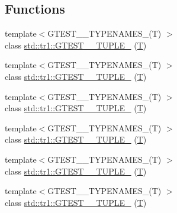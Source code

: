 \subsection*{Functions}
\begin{DoxyCompactItemize}
\item 
{\footnotesize template$<$G\+T\+E\+S\+T\+\_\+\_\+\+T\+Y\+P\+E\+N\+A\+M\+E\+S\+\_\+(\+T) $>$ }\\class \hyperlink{namespacestd_1_1tr1_a9971f52f994f142fe36c786b991cfd3e}{std\+::tr1\+::\+G\+T\+E\+S\+T\+\_\+\_\+\+T\+U\+P\+L\+E\+\_\+} (\hyperlink{functions__7_8js_adf1f3edb9115acb0a1e04209b7a9937b}{T})
\item 
{\footnotesize template$<$G\+T\+E\+S\+T\+\_\+\_\+\+T\+Y\+P\+E\+N\+A\+M\+E\+S\+\_\+(\+T) $>$ }\\class \hyperlink{namespacestd_1_1tr1_a05651180c3a4c06fe0f3b09144b82b93}{std\+::tr1\+::\+G\+T\+E\+S\+T\+\_\+\_\+\+T\+U\+P\+L\+E\+\_\+} (\hyperlink{functions__7_8js_adf1f3edb9115acb0a1e04209b7a9937b}{T})
\item 
{\footnotesize template$<$G\+T\+E\+S\+T\+\_\+\_\+\+T\+Y\+P\+E\+N\+A\+M\+E\+S\+\_\+(\+T) $>$ }\\class \hyperlink{namespacestd_1_1tr1_a368170c49cc7d7f130c0564bbad01205}{std\+::tr1\+::\+G\+T\+E\+S\+T\+\_\+\_\+\+T\+U\+P\+L\+E\+\_\+} (\hyperlink{functions__7_8js_adf1f3edb9115acb0a1e04209b7a9937b}{T})
\item 
{\footnotesize template$<$G\+T\+E\+S\+T\+\_\+\_\+\+T\+Y\+P\+E\+N\+A\+M\+E\+S\+\_\+(\+T) $>$ }\\class \hyperlink{namespacestd_1_1tr1_a661b17d2b7137863f06a016762f5c888}{std\+::tr1\+::\+G\+T\+E\+S\+T\+\_\+\_\+\+T\+U\+P\+L\+E\+\_\+} (\hyperlink{functions__7_8js_adf1f3edb9115acb0a1e04209b7a9937b}{T})
\item 
{\footnotesize template$<$G\+T\+E\+S\+T\+\_\+\_\+\+T\+Y\+P\+E\+N\+A\+M\+E\+S\+\_\+(\+T) $>$ }\\class \hyperlink{namespacestd_1_1tr1_a51b070e2eb5e6bb83a290f35c19667dd}{std\+::tr1\+::\+G\+T\+E\+S\+T\+\_\+\_\+\+T\+U\+P\+L\+E\+\_\+} (\hyperlink{functions__7_8js_adf1f3edb9115acb0a1e04209b7a9937b}{T})
\item 
{\footnotesize template$<$G\+T\+E\+S\+T\+\_\+\_\+\+T\+Y\+P\+E\+N\+A\+M\+E\+S\+\_\+(\+T) $>$ }\\class \hyperlink{namespacestd_1_1tr1_a485b05fdbbcfcf7ad5e4234e17702268}{std\+::tr1\+::\+G\+T\+E\+S\+T\+\_\+\_\+\+T\+U\+P\+L\+E\+\_\+} (\hyperlink{functions__7_8js_adf1f3edb9115acb0a1e04209b7a9937b}{T})
\item 

\end{DoxyCompactItemize}

